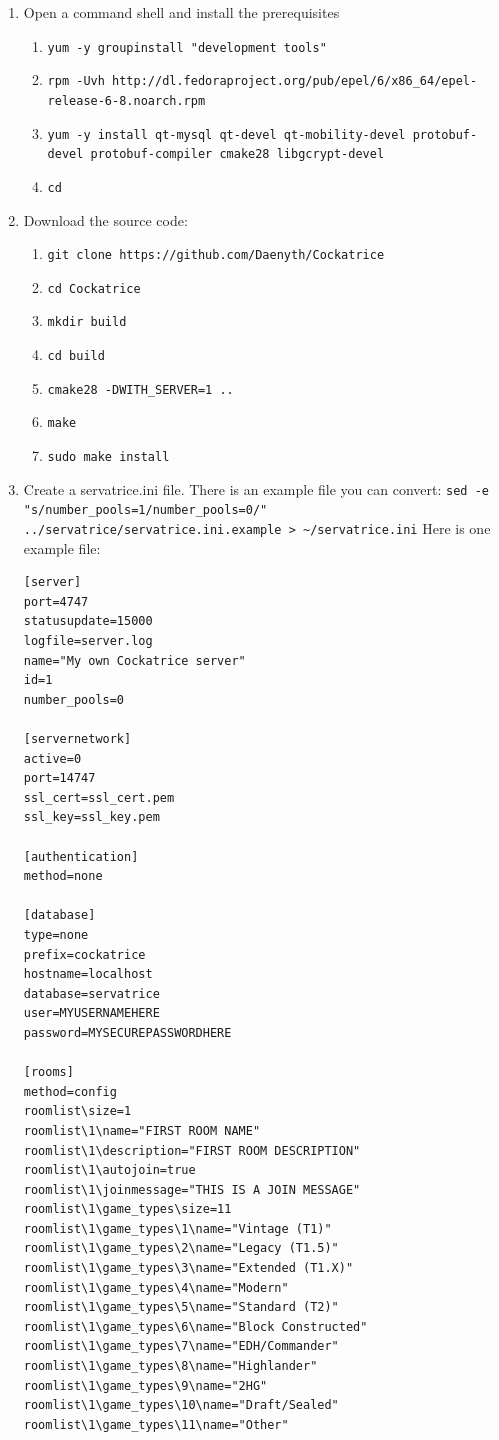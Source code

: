 \documentclass[a4paper]{scrbook}
\newcommand{\shellcmd}[1]{\texttt{\scriptsize #1}}
\begin{document}
\begin{enumerate}
 \item Open a command shell and install the prerequisites
\begin{enumerate}
 \item \shellcmd{yum -y groupinstall "development tools"}
 \item \shellcmd{rpm -Uvh http://dl.fedoraproject.org/pub/epel/6/x86\_64/epel-release-6-8.noarch.rpm}
 \item \shellcmd{yum -y install qt-mysql qt-devel qt-mobility-devel protobuf-devel protobuf-compiler cmake28 libgcrypt-devel}
 \item \shellcmd{cd}
\end{enumerate}

 \item Download the source code:
\begin{enumerate}
 \item \shellcmd{git clone https://github.com/Daenyth/Cockatrice}
 \item \shellcmd{cd Cockatrice}
 \item \shellcmd{mkdir build}
 \item \shellcmd{cd build}
 \item \shellcmd{cmake28 -DWITH\_SERVER=1 ..}
 \item \shellcmd{make}
 \item \shellcmd{sudo make install}
\end{enumerate}

 \item Create a servatrice.ini file. There is an example file you can convert:
\shellcmd{sed -e "s/number\_pools=1/number\_pools=0/" ../servatrice/servatrice.ini.example > \textasciitilde/servatrice.ini}
Here is one example file:
\begin{framed}
\begin{verbatim}
[server]
port=4747
statusupdate=15000
logfile=server.log
name="My own Cockatrice server"
id=1
number_pools=0

[servernetwork]
active=0
port=14747
ssl_cert=ssl_cert.pem
ssl_key=ssl_key.pem

[authentication]
method=none

[database]
type=none
prefix=cockatrice
hostname=localhost
database=servatrice
user=MYUSERNAMEHERE
password=MYSECUREPASSWORDHERE

[rooms]
method=config
roomlist\size=1
roomlist\1\name="FIRST ROOM NAME"
roomlist\1\description="FIRST ROOM DESCRIPTION"
roomlist\1\autojoin=true
roomlist\1\joinmessage="THIS IS A JOIN MESSAGE"
roomlist\1\game_types\size=11
roomlist\1\game_types\1\name="Vintage (T1)"
roomlist\1\game_types\2\name="Legacy (T1.5)"
roomlist\1\game_types\3\name="Extended (T1.X)"
roomlist\1\game_types\4\name="Modern"
roomlist\1\game_types\5\name="Standard (T2)"
roomlist\1\game_types\6\name="Block Constructed"
roomlist\1\game_types\7\name="EDH/Commander"
roomlist\1\game_types\8\name="Highlander"
roomlist\1\game_types\9\name="2HG"
roomlist\1\game_types\10\name="Draft/Sealed"
roomlist\1\game_types\11\name="Other"


\end{verbatim}
\end{framed}
\end{enumerate}
\end{document}

